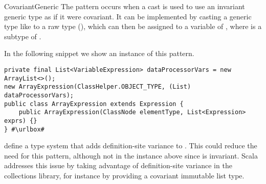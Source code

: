 \begin{pattern}{CovariantGeneric}
The \thisp{} pattern occurs when a cast is used
to use an invariant generic type as if it were covariant.
It can be implemented by
casting a generic type like  to a raw type (),
which can then be assigned to a variable of ,
where  is a subtype of .


\instances{}
In the following snippet we show an instance of this pattern.
\def\urlvar{http://bit.ly/spockframework_spock_2UYEsF5}
\begin{verbatim}
private final List<VariableExpression> dataProcessorVars = new ArrayList<>();
new ArrayExpression(ClassHelper.OBJECT_TYPE, (List) dataProcessorVars);
public class ArrayExpression extends Expression {
    public ArrayExpression(ClassNode elementType, List<Expression> exprs) {}
} #\urlbox#
\end{verbatim}


\issues{}
\citet{altidorTamingWildcardsCombining2011} define a type system that adds
definition-site variance to \java{}.
This could reduce the need for this pattern,
although not in the instance above since  is invariant.
Scala addresses this issue by taking advantage of definition-site variance in
the collections library, for instance by providing a covariant immutable list type.

\end{pattern}
